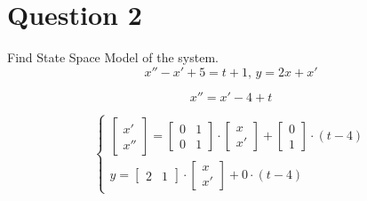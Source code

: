 \documentclass[12pt,letterpaper]{article}
\begin{document}
\newpage
\section*{Question 2}
\setcounter{equation}{0}
\begin{enumerate}[leftmargin=!,labelindent=5pt]
     Find State Space Model of the system.
     \begin{equation*}
         x'' - x' +5 = t + 1\text{,  } y=2x+x'
     \end{equation*}
        
    \begin{equation*}
        x'' = x' - 4 + t
    \end{equation*}
   
   \begin{equation*}
        \begin{cases}
            \left[\begin{matrix}x'\\x''\end{matrix}\right] = 
            \left[\begin{matrix}0&1\\0&1\end{matrix}\right] \cdot 
            \left[\begin{matrix}x\\x'\end{matrix}\right] + 
            \left[\begin{matrix}0\\1\end{matrix}\right] \cdot (t-4) \\ 
         y = \left[\begin{matrix}2&1\end{matrix}\right] \cdot
        \left[\begin{matrix}x\\x'\end{matrix}\right] + 0 \cdot (t-4)
    \end{cases}
   \end{equation*}
\end{enumerate}
\end{document}
